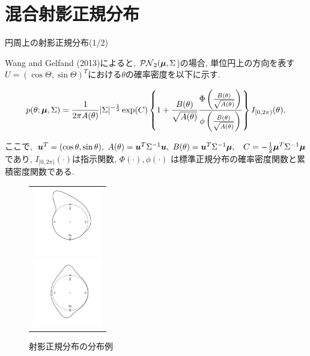 \documentclass[dvipdfmx]{beamer} %
\newcommand{\bm}[1]{\mbox{\boldmath $#1$}}
\begin{document}
\section{混合射影正規分布}
\begin{frame}{円周上の射影正規分布(1/2)}

Wang and Gelfand (2013)によると, $\mathcal{PN}_2(\bm \mu,\Sigma$)の場合, 単位円上の方向を表す$U = (\cos\Theta, \sin\Theta)^T$における$\theta$の確率密度を以下に示す.

\footnotesize
\begin{eqnarray*}
\label{PNC}
p(\theta; \bm \mu, \Sigma) = \frac{1}{2\pi A(\theta)}|\Sigma|^{-\frac{1}{2}}
\exp(C)\left\{1 + \frac{B(\theta)}{\sqrt{A(\theta)}} \frac{\Phi \left(\frac{B(\theta)}{\sqrt{A(\theta)}}\right)}{\phi \left(\frac{B(\theta)}{\sqrt{A(\theta)}}\right)}\right\} I_{[0,2\pi)}(\theta),
\end{eqnarray*}
\normalsize

\noindent
ここで, $\bm u^T = (\cos\theta,\sin\theta), \ A(\theta) = \bm u^T\Sigma^{-1}\bm u, \ B(\theta) = \bm u^T \Sigma^{-1} \bm \mu,$
$\ C = -\frac{1}{2} \bm \mu^T \Sigma^{-1} \bm \mu$であり, $I_{[0,2\pi)} (\cdot)$は指示関数, $\Phi(\cdot), \phi(\cdot)$ は標準正規分布の確率密度関数と累積密度関数である.

\begin{figure}[H]
 \begin{tabular}{c}
 \begin{minipage}{0.5\hsize}
  \begin{center}
   \includegraphics[clip,height= 30mm]{data/sample_asymmetry.png}
  \end{center}
 \end{minipage}
 \hspace{-2.0cm}
 \begin{minipage}{0.5\hsize}
  \begin{center}
 \includegraphics[clip,height= 30mm]{data/sample_bimodal.png}
  \end{center}
 \end{minipage}
\end{tabular}
\caption{射影正規分布の分布例}
\end{figure}

\end{frame}
\end{document}
